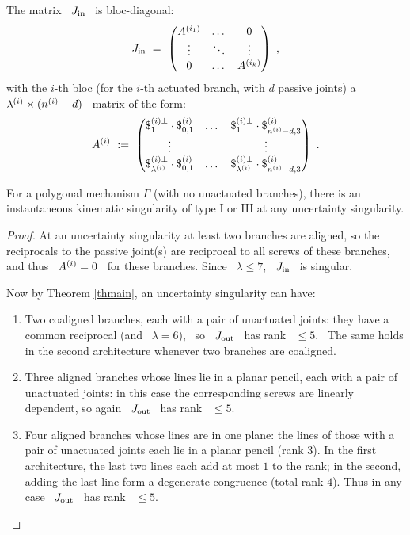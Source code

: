 The matrix \ $J_{\operatorname{in}}$ \ is bloc-diagonal:
$$
J_{\operatorname{in}}~=~
\begin{pmatrix}
A\sp{({i_{1}})} & \dotsc & 0     \\
\vdots      & \ddots & \vdots \\
0           & \dotsc & A\sp{({i_{k}})}
\end{pmatrix}~,
$$
%
with the $i$-th bloc (for the $i$-th actuated branch, with $d$ passive
joints) a \ $\lambda\sp{({i})}\times(n\sp{({i})}-d)$ \ matrix of the form:
$$
A\sp{({i})}~:=~\begin{pmatrix}
\$^{({i})\perp}_{1}\cdot\$\sp{({i})}_{0,1} & \dotsc & \$^{({i})\perp}_{1}\cdot\$\sp{({i})}_{n\sp{({i})}-d,3}\\
\vdots & & \vdots \\
\$^{({i})\perp}_{\lambda\sp{({i})}}\cdot\$\sp{({i})}_{0,1} & \dotsc &
\$^{({i})\perp}_{\lambda\sp{({i})}}\cdot\$\sp{({i})}_{n\sp{({i})}-d,3}
\end{pmatrix}~.
$$

\begin{prop}\label{pkinsing}
%
For a polygonal mechanism $\Gamma$ (with no unactuated branches), there
is an instantaneous kinematic singularity of type I or III at any
uncertainty singularity.
%
\end{prop}

\begin{proof}
%
At an uncertainty singularity at least two branches are aligned,
so the reciprocals to the passive joint(s) are reciprocal to all
screws of these branches, and thus \ $A\sp{({i})}=0$ \ for these branches. Since \
$\lambda\leq 7$, \ $J_{\operatorname{in}}$ \ is singular.

Now by Theorem \ref{thmain}, an uncertainty singularity can have:
%
\begin{enumerate}
%
\item Two coaligned branches, each with a pair of unactuated joints:
  they have a common reciprocal (and \ $\lambda=6$), \ so \
  $J_{\operatorname{out}}$ \ has rank \ $\leq 5$. \ The same holds in the second
  architecture whenever two branches are coaligned.
%
\item Three aligned branches whose lines lie in a planar pencil, each with
  a pair of unactuated joints: in this case the corresponding screws
  are linearly dependent, so again \ $J_{\operatorname{out}}$ \ has rank \ $\leq 5$.
%
\item Four aligned branches whose lines are in one plane: the lines of
  those with a pair of unactuated joints each lie in a
  planar pencil (rank $3$). In the first architecture, the last two
  lines each add at most $1$ to the rank; in the second, adding the last
  line form a degenerate congruence (total rank $4$). Thus in any case \
  $J_{\operatorname{out}}$ \ has rank \ $\leq 5$.
%
\end{enumerate}
%
\end{proof}

